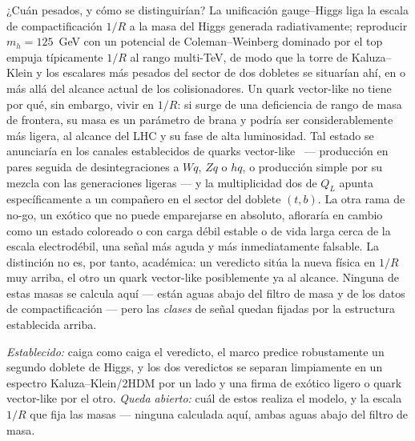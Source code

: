 \documentclass[11pt,a4paper]{article}
\begin{document}
¿Cu\'an pesados, y c\'omo se distinguir\'ian? La unificaci\'on gauge--Higgs liga la escala de
compactificaci\'on $1/R$ a la masa del Higgs generada radiativamente; reproducir
$m_h=125$~GeV con un potencial de Coleman--Weinberg dominado por el top empuja t\'ipicamente
$1/R$ al rango multi-TeV, de modo que la torre de Kaluza--Klein y los escalares m\'as pesados
del sector de dos dobletes se situar\'ian ah\'i, en o m\'as all\'a del alcance actual de los
colisionadores. Un quark vector-like no tiene por qu\'e, sin embargo, vivir en $1/R$: si surge
de una deficiencia de rango de masa de frontera, su masa es un par\'ametro de brana y podr\'ia
ser considerablemente m\'as ligera, al alcance del LHC y su fase de alta luminosidad. Tal
estado se anunciar\'ia en los canales establecidos de quarks vector-like~\cite{VLQ} ---
producci\'on en pares seguida de desintegraciones a $Wq$, $Zq$ o $hq$, o producci\'on simple
por su mezcla con las generaciones ligeras --- y la multiplicidad dos de $Q_L$ apunta
espec\'ificamente a un compa\~nero en el sector del doblete $(t,b)$. La otra rama de no-go, un
ex\'otico que no puede emparejarse en absoluto, aflorar\'ia en cambio como un estado coloreado
o con carga d\'ebil estable o de vida larga cerca de la escala electrod\'ebil, una se\~nal m\'as
aguda y m\'as inmediatamente falsable. La distinci\'on no es, por tanto, acad\'emica: un
veredicto sit\'ua la nueva f\'isica en $1/R$ muy arriba, el otro un quark vector-like
posiblemente ya al alcance. Ninguna de estas masas se calcula aqu\'i --- est\'an aguas abajo
del filtro de masa y de los datos de compactificaci\'on --- pero las \emph{clases} de se\~nal
quedan fijadas por la estructura establecida arriba.

\emph{Establecido:} caiga como caiga el veredicto, el marco predice robustamente un segundo
doblete de Higgs, y los dos veredictos se separan limpiamente en un espectro Kaluza--Klein/2HDM
por un lado y una firma de ex\'otico ligero o quark vector-like por el otro. \emph{Queda
abierto:} cu\'al de estos realiza el modelo, y la escala $1/R$ que fija las masas --- ninguna
calculada aqu\'i, ambas aguas abajo del filtro de masa.

\end{document}
